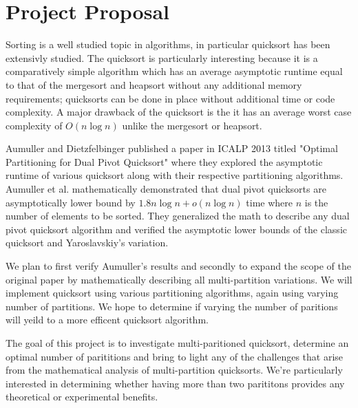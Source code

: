 \documentclass[12pt]{report}
\begin{document}
	\section{Project Proposal}
	
	Sorting is a well studied topic in algorithms, in particular quicksort has been extensivly studied. 
	The quicksort is particularly interesting because it is a comparatively simple algorithm which has an average asymptotic runtime equal to that of the mergesort and heapsort without any additional memory requirements; quicksorts can be done in place without additional time or code complexity. 
	A major drawback of the quicksort is the it has an average worst case complexity of $O(n\log n)$ unlike the mergesort or heapsort\cite{sedgewick1977analysis}.

	Aumuller and Dietzfelbinger published a paper in ICALP 2013 titled "Optimal Partitioning for Dual Pivot Quicksort" where they explored the asymptotic runtime of various quicksort along with their respective partitioning algorithms\cite{Aumuller:2013:OPD:2525857.2525862}. 
	Aumuller et al. mathematically demonstrated that dual pivot quicksorts are asymptotically lower bound by $1.8n\log n + o(n\log n)$ time where $n$ is the number of elements to be sorted. 
	They generalized the math to describe any dual pivot quicksort algorithm and verified the asymptotic lower bounds of the classic quicksort and Yaroslavskiy's variation\cite{Wild:2012:ACA:2404160.2404231}. 

	We plan to first verify Aumuller's results and secondly to expand the scope of the original paper by mathematically describing all multi-partition variations. 
	We will implement quicksort using various partitioning algorithms, again using varying number of partitions. We hope to determine if varying the number of paritions will yeild to a more efficent quicksort algorithm.

	The goal of this project is to investigate multi-paritioned quicksort, determine an optimal number of parititions and bring to light any of the challenges that arise from the mathematical analysis of multi-partition quicksorts. 
	We're particularly interested in determining whether having more than two parititons provides any theoretical or experimental benefits.
\end{document}
